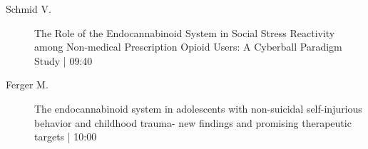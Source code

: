 \begin{symposium}
\begin{description}
                \item [ Schmid V.] The Role of the Endocannabinoid System in Social Stress Reactivity among Non-medical Prescription Opioid Users: A Cyberball Paradigm Study  \textcolor{mygray}{ | 09:40}    
                
                \item [ Ferger M.] The endocannabinoid system in adolescents with non-suicidal self-injurious behavior and childhood trauma- new findings and promising therapeutic targets \textcolor{mygray}{ | 10:00}    
                
            \end{description} 
            \end{symposium}
            